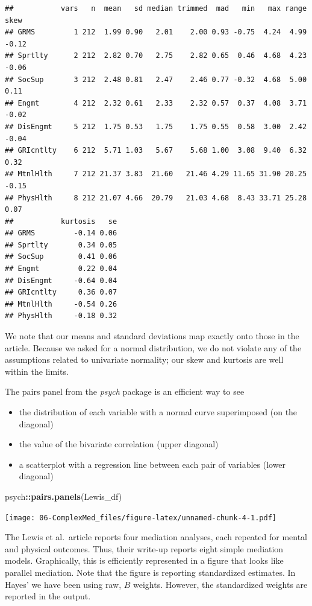 \documentclass[
  11pt,
]{book}
\newenvironment{Shaded}{\begin{snugshade}}{\end{snugshade}}
\newcommand{\FunctionTok}[1]{\textcolor[rgb]{0.27,0.27,0.27}{\textbf{#1}}}
\newcommand{\NormalTok}[1]{#1}
\newcommand{\SpecialCharTok}[1]{\textcolor[rgb]{0.43,0.43,0.43}{\textbf{#1}}}
\providecommand{\tightlist}{%
  \setlength{\itemsep}{0pt}\setlength{\parskip}{0pt}}
\begin{document}
\begin{verbatim}
##           vars   n  mean   sd median trimmed  mad   min   max range  skew
## GRMS         1 212  1.99 0.90   2.01    2.00 0.93 -0.75  4.24  4.99 -0.12
## Sprtlty      2 212  2.82 0.70   2.75    2.82 0.65  0.46  4.68  4.23 -0.06
## SocSup       3 212  2.48 0.81   2.47    2.46 0.77 -0.32  4.68  5.00  0.11
## Engmt        4 212  2.32 0.61   2.33    2.32 0.57  0.37  4.08  3.71 -0.02
## DisEngmt     5 212  1.75 0.53   1.75    1.75 0.55  0.58  3.00  2.42 -0.04
## GRIcntlty    6 212  5.71 1.03   5.67    5.68 1.00  3.08  9.40  6.32  0.32
## MtnlHlth     7 212 21.37 3.83  21.60   21.46 4.29 11.65 31.90 20.25 -0.15
## PhysHlth     8 212 21.07 4.66  20.79   21.03 4.68  8.43 33.71 25.28  0.07
##           kurtosis   se
## GRMS         -0.14 0.06
## Sprtlty       0.34 0.05
## SocSup        0.41 0.06
## Engmt         0.22 0.04
## DisEngmt     -0.64 0.04
## GRIcntlty     0.36 0.07
## MtnlHlth     -0.54 0.26
## PhysHlth     -0.18 0.32
\end{verbatim}

We note that our means and standard deviations map exactly onto those in the article. Because we asked for a normal distribution, we do not violate any of the assumptions related to univariate normality; our skew and kurtosis are well within the limits.

The pairs panel from the \emph{psych} package is an efficient way to see

\begin{itemize}
\tightlist
\item
  the distribution of each variable with a normal curve superimposed (on the diagonal)
\item
  the value of the bivariate correlation (upper diagonal)
\item
  a scatterplot with a regression line between each pair of variables (lower diagonal)
\end{itemize}

\begin{Shaded}
\begin{Highlighting}[]
\NormalTok{psych}\SpecialCharTok{::}\FunctionTok{pairs.panels}\NormalTok{(Lewis\_df)}
\end{Highlighting}
\end{Shaded}

\texttt{[image: 06-ComplexMed\_files/figure-latex/unnamed-chunk-4-1.pdf]}

The Lewis et al.~article \citeyearpar{lewis_applying_2017} reports four mediation analyses, each repeated for mental and physical outcomes. Thus, their write-up reports eight simple mediation models. Graphically, this is efficiently represented in a figure that looks like parallel mediation. Note that the figure is reporting standardized estimates. In Hayes' \citeyearpar{hayes_introduction_2018} we have been using raw, \(B\) weights. However, the standardized weights are reported in the output.
\end{document}
